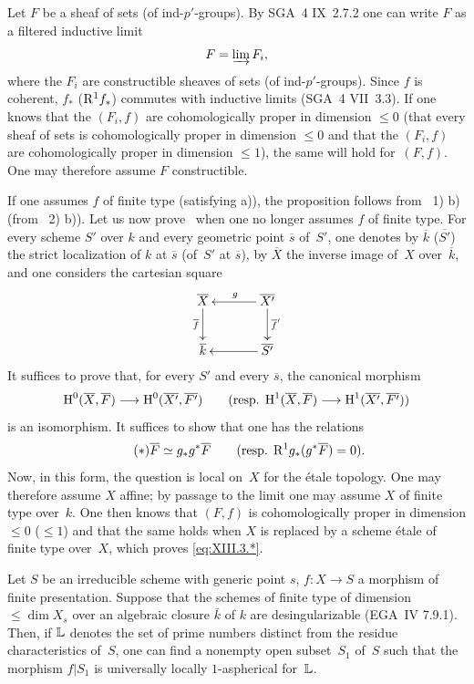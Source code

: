 Let $F$ be a sheaf of sets (\resp of
ind-$p'$-groups). By SGA~4 IX~2.7.2 one can write
$F$ as a filtered inductive limit
$$
F=\varinjlim F_i,
$$
where the $F_i$ are constructible sheaves of sets (\resp of
ind-$p'$-groups). Since $f$ is coherent, $f_*$
(\resp $\mathrm{R}^1f_*$) commutes with inductive limits (SGA~4 VII~3.3). If
one knows that the $(F_i,f)$ are cohomologically proper in
dimension $\leq 0$ (\resp that every sheaf of sets is
cohomologically proper in dimension $\leq 0$ and that the $(F_i,f)$
are cohomologically proper in dimension $\leq 1$), the same will
hold for~$(F,f)$. One may therefore assume $F$ constructible.

If one assumes $f$ of finite type (\resp satisfying a)), the
proposition follows from ~1)\kern2pt b) (\resp from
~2)\kern2pt b)). Let us now prove~ when one no longer
assumes $f$ of finite type. For every scheme $S'$ over
$k$ and every geometric point $\overline{s}$ of~$S'$, one
denotes by $\overline{k}$ (\resp $\overline{S'}$) the strict localization of
$k$ at $\overline{s}$ (\resp of~$S'$ at $\overline{s}$),
by $\overline{X}$ the inverse image of~$X$ over~$\overline{k}$, and one
considers the cartesian square
$$
\xymatrix@C=1.2cm{
\overline{X}\ar[d]_-{\overline{f}}&\ar[l]_g \overline{X'}\ar[d]^-{\overline{f}'}\\ \overline{k}&\ar[l]\overline{S'}
}
$$
It suffices to prove that, for every $S'$ and every $\overline{s}$, the
canonical morphism
$$
\H^0(\overline{X},\overline{F})\to
\H^0(\overline{X'},\overline{F'})\qquad
\text{(\resp $\H^1(\overline{X},\overline{F})\to
\H^1(\overline{X'},\overline{F'})$)}
$$
is an isomorphism. It suffices to show that one has the relations
\begin{equation*}
\label{eq:XIII.3.*}
\tag{$*$} \overline{F}\simeq g_*g^*\overline{F}\qquad
\text{(\resp $\R^1g_*(g^*\overline{F})=0$).}
\end{equation*}
Now, in this form, the question is local on~$X$ for the \'etale
topology. One may therefore assume $X$ affine; by passage to the
limit one may assume $X$ of finite type over~$k$. One then knows that
$(F,f)$ is cohomologically proper in dimension $\leq 0$
(\resp $\leq 1$) and that the same holds when $X$ is replaced by
a scheme \'etale of finite type over~$X$, which proves
\eqref{eq:XIII.3.*}.

\begin{theorem}
\label{XIII.3.3}
Let $S$ be an irreducible scheme with generic point
$s$, $f\colon X\to S$ a morphism of finite
presentation. Suppose that the schemes of finite type of dimension
$\leqslant\dim X_s$ over an algebraic closure $\bar{k}$ of
$k$ are desingularizable \textup{(EGA~IV 7.9.1)}. Then, if $\mathbb{L}$
denotes the set of prime numbers distinct from the
residue characteristics of~$S$, one can find a nonempty open
subset~$S_1$ of~$S$ such that the morphism $f|S_1$ is
universally locally $1$-aspherical for~$\mathbb{L}$.
\end{theorem}

